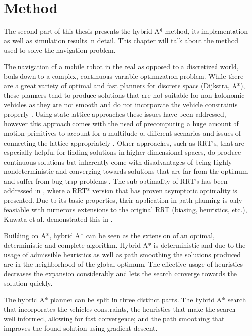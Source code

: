 \chapter{Method}
The second part of this thesis presents the hybrid A* method, its implementation as well as simulation results in detail. This chapter will talk about the method used to solve the navigation problem.

The navigation of a mobile robot in the real as opposed to a discretized world, boils down to a complex, continuous-variable optimization problem. While there are a great variety of optimal and fast planners for discrete space (Dijkstra, A*), these planners tend to produce solutions that are not suitable for non-holonomic vehicles as they are not smooth and do not incorporate the vehicle constraints properly \cite{Dolgov.2008}. Using state lattice approaches these issues have been addressed, however this approach comes with the need of precomputing a huge amount of motion primitives to account for a multitude of different scenarios and issues of connecting the lattice appropriately \cite{Urmson.2008,Ferguson.2008b,Ferguson.2008}.
Other approaches, such as RRT's, that are especially helpful for finding solutions in higher dimensional spaces, do produce continuous solutions but inherently come with disadvantages of being highly nondeterministic and converging towards solutions that are far from the optimum and suffer from bug trap problems \cite{Karaman.2011}. The sub-optimality of RRT's has been addressed in \cite{Karaman.2011}, where a RRT* version that has proven asymptotic optimality is presented. Due to its basic properties, their application in path planning is only feasiable with numerous extensions to the original RRT (biasing, heuristics, etc.), Kuwata et al. demonstrated this in \cite{Kuwata.2008}.

Building on A*, hybrid A* can be seen as the extension of an optimal, deterministic and complete algorithm. Hybrid A* is deterministic and due to the usage of admissible heuristics as well as path smoothing the solutions produced are in the neighborhood of the global optimum. The effective usage of heuristics decreases the expansion considerably and lets the search converge towards the solution quickly.

The hybrid A* planner can be split in three distinct parts. The hybrid A* search that incorporates the vehicles constraints, the heuristics that make the search well informed, allowing for fast convergence; and the path smoothing that improves the found solution using gradient descent.



